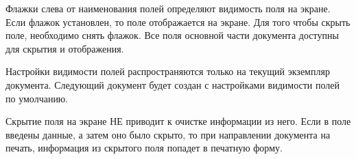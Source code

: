 Флажки слева от наименования полей определяют видимость поля на экране. Если флажок установлен, то поле отображается на экране. Для того чтобы скрыть поле, необходимо снять флажок. Все поля основной части документа доступны для скрытия и отображения. 

\begin{prim}
Настройки видимости полей распространяются только на текущий экземпляр документа. Следующий документ будет создан с настройками видимости полей по умолчанию.
\end{prim}

\begin{vnim}
 Скрытие поля на экране НЕ приводит к очистке информации из него. Если в поле введены данные, а затем оно было скрыто, то при направлении документа на печать, информация из скрытого поля попадет в печатную форму. 
\end{vnim}

